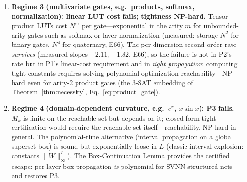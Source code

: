 \begin{theorem}
\begin{enumerate}
    \item \textbf{Regime 3 (multivariate gates, e.g.\ products,
    softmax, normalization): linear LUT cost fails; tightness NP-hard.}
    Tensor-product LUTs cost $N^m$ per gate---exponential in the arity
    $m$ for unbounded-arity gates such as softmax or layer normalization
    (measured: storage $N^2$ for binary gates, $N^4$ for quaternary,
    E66). The per-dimension second-order rate \emph{survives}
    (measured slopes $-2.11$, $-1.82$, E66), so the failure is not in
    P2's rate but in P1's linear-cost requirement and in \emph{tight
    propagation}: computing tight constants requires solving
    polynomial-optimization reachability---NP-hard even for arity-2
    product gates (the 3-SAT embedding of Theorem~\ref{thm:necessity},
    Eq.~\ref{eq:product_gate}).

    \item \textbf{Regime 4 (domain-dependent curvature, e.g.\ $e^x$,
    $x \sin x$): P3 fails.} $M_k$ is finite on the reachable set but
    depends on it; closed-form tight certification would require the
    reachable set itself---reachability, NP-hard in general. The
    polynomial-time alternative (interval propagation on a global
    superset box) is sound but exponentially loose in $L$ (classic
    interval explosion: constants $\|W\|_\infty^L$). The Box-Continuation
    Lemma provides the certified escape: per-layer box propagation
    \emph{is} polynomial for SVNN-structured nets and restores P3.


\end{enumerate}
\end{theorem}
